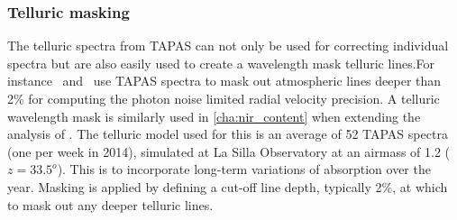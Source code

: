 \subsubsection{Telluric masking}
The telluric spectra from {TAPAS} can not only be used for correcting individual spectra but are also easily used to create a wavelength mask telluric lines.For instance~\citet{figueira_radial_2016} and~\citet{artigau_optical_2018} use {TAPAS} spectra to mask out atmospheric lines deeper than 2\% for computing the photon noise limited radial velocity precision.
A telluric wavelength mask is similarly used in \cref{cha:nir_content} when extending the analysis of \citet{figueira_radial_2016}.
The telluric model used for this is an average of 52 {TAPAS} spectra (one per week in 2014), simulated at La Silla Observatory at an airmass of 1.2 (\(z = 33.5^{o}\)).
This is to incorporate long-term variations of absorption over the year.
Masking is applied by defining a cut-off line depth, typically 2\%, at which to mask out any deeper telluric lines.


